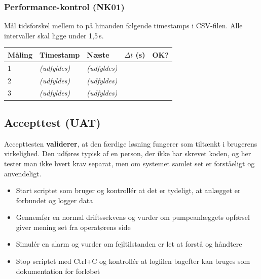 \documentclass[12pt, a4paper]{article}
\begin{document}
\vspace{0.5cm}

\subsubsection{Performance-kontrol (NK01)}

Mål tidsforskel mellem to på hinanden følgende timestamps i CSV-filen.
Alle intervaller skal ligge under 1{,}5\,s.

\begin{center}
\begin{tabular}{lllll}
\toprule
\textbf{Måling} & \textbf{Timestamp} & \textbf{Næste} & \textbf{$\Delta t$ (s)} & \textbf{OK?} \\
\midrule
1 & \textit{(udfyldes)} & \textit{(udfyldes)} & & \\
2 & \textit{(udfyldes)} & \textit{(udfyldes)} & & \\
3 & \textit{(udfyldes)} & \textit{(udfyldes)} & & \\
\bottomrule
\end{tabular}
\end{center}

\subsection{Accepttest (UAT)}\label{sec:accepttest}

\begin{tcolorbox}[defbox, title={\faUserCircle\quad Accepttest --- brugerens perspektiv}]
Accepttesten \textbf{validerer}, at den færdige løsning fungerer som tiltænkt i
brugerens virkelighed.
Den udføres typisk af en person, der ikke har skrevet koden, og her tester man
ikke hvert krav separat, men om systemet samlet set er forståeligt og anvendeligt.

\vspace{6pt}
\begin{itemize}[leftmargin=1.2em, itemsep=4pt]
  \item[\textcolor{accentblue}{\faCheckSquare}]
    Start scriptet som bruger og kontrollér at det er tydeligt, at anlægget er
    forbundet og logger data
  \item[\textcolor{accentblue}{\faCheckSquare}]
    Gennemfør en normal driftssekvens og vurder om pumpeanlæggets opførsel giver
    mening set fra operatørens side
  \item[\textcolor{accentblue}{\faCheckSquare}]
    Simulér en alarm og vurder om fejltilstanden er let at forstå og håndtere
  \item[\textcolor{accentblue}{\faCheckSquare}]
    Stop scriptet med Ctrl+C og kontrollér at logfilen bagefter kan bruges som
    dokumentation for forløbet
\end{itemize}
\end{tcolorbox}
\end{document}
